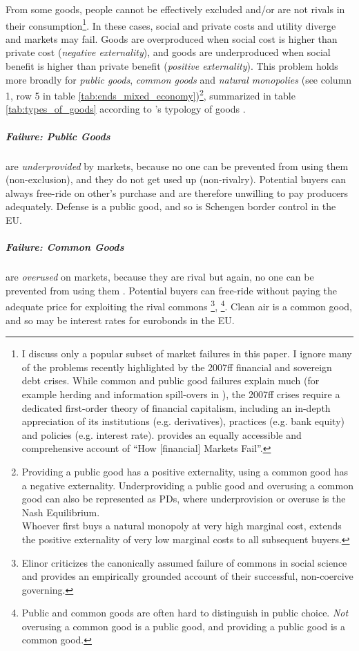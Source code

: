 From some goods, people cannot be effectively excluded and/or are not rivals in their consumption\footnote{
	I discuss only a popular subset of market failures in this paper. I ignore many of the problems recently highlighted by the 2007ff financial and sovereign debt crises. While common and public good failures explain much (for example herding and information spill-overs in \citealt{Banerjee-1992-aa}), the 2007ff crises require a dedicated first-order theory of financial capitalism, including an in-depth appreciation of its institutions (e.g. derivatives), practices (e.g. bank equity) and policies (e.g. interest rate). \cite{Cassidy2010} provides an equally accessible and comprehensive account of ``How [financial] Markets Fail''.}. %
In these cases, social and private costs and utility diverge and markets may fail. Goods are overproduced when social cost is higher than private cost (\emph{negative externality}), and goods are underproduced when social benefit is higher than private benefit (\emph{positive externality}). This problem holds more broadly for \emph{public goods}, \emph{common goods} and \emph{natural monopolies} (see column 1, row 5 in table \ref{tab:ends_mixed_economy})\footnote{
	Providing a public good has a positive externality, using a common good has a negative externality. Underproviding a public good and overusing a common good can also be represented as \glspl{PD}, where underprovision or overuse is the Nash Equilibrium. \\ Whoever first buys a natural monopoly at very high marginal cost, extends the positive externality of very low marginal costs to all subsequent buyers.}, 
summarized in table \ref{tab:types_of_goods} according to \citeauthor{Samuelson-1954-eu}'s typology of goods \citeyearpar{Samuelson-1954-eu}. 



\subparagraph{Failure: Public Goods}  \label{sec:public_good} are \emph{underprovided} by markets, because no one can be prevented from using them (non-exclusion), and they do not get used up (non-rivalry). Potential buyers can always free-ride on other's purchase and are therefore unwilling to pay producers adequately. Defense is a public good, and so is Schengen border control in the \gls{EU}. 

\subparagraph{Failure: Common Goods}  \label{sec:common_good} are \emph{overused} on markets, because they are rival but again, no one can be prevented from using them \citep{Hardin-1968-aa}. Potential buyers can free-ride without paying the adequate price for exploiting the rival commons \citep{Hardin-1968-aa}\footnote{
	Elinor \cite{Ostrom1990} criticizes the canonically assumed failure of commons in social science and provides an empirically grounded account of their successful, non-coercive governing.}, 
	\footnote{Public and common goods are often hard to distinguish in public choice. \emph{Not} overusing a common good is a public good, and providing a public good is a common good.}.
Clean air is a common good, and so may be interest rates for eurobonds in the \gls{EU}. 

